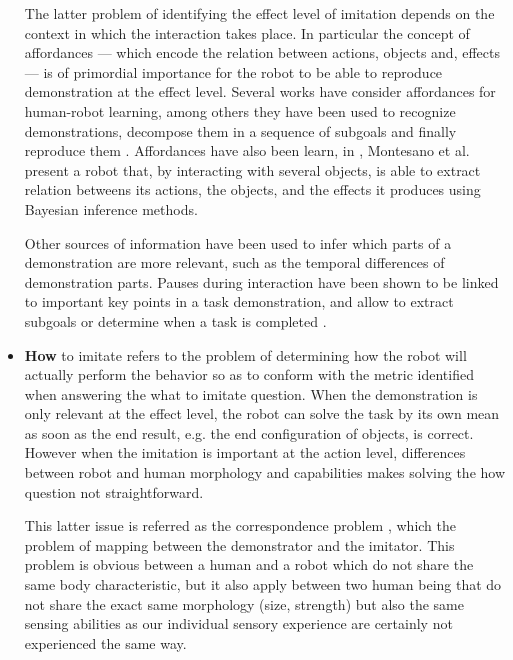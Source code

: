\begin{itemize}
The latter problem of identifying the effect level of imitation depends on the context in which the interaction takes place. In particular the concept of affordances \cite{gibson1986ecological} --- which encode the relation between actions, objects and, effects --- is of primordial importance for the robot to be able to reproduce demonstration at the effect level. Several works have consider affordances for human-robot learning, among others they have been used to recognize demonstrations, decompose them in a sequence of subgoals and finally reproduce them \cite{macl07affimit}. Affordances have also been learn, in \cite{montesano2008learning}, Montesano et al. present a robot that, by interacting with several objects, is able to extract relation betweens its actions, the objects, and the effects it produces using Bayesian inference methods. 

Other sources of information have been used to infer which parts of a demonstration are more relevant, such as the temporal differences of demonstration parts. Pauses during interaction have been shown to be linked to important key points in a task demonstration, and allow to extract subgoals or determine when a task is completed \cite{theofilis2013temporal}.

\item \textbf{How} to imitate refers to the problem of determining how the robot will actually perform the behavior so as to conform with the metric identified when answering the what to imitate question. When the demonstration is only relevant at the effect level, the robot can solve the task by its own mean as soon as the end result, e.g. the end configuration of objects, is correct. However when the imitation is important at the action level, differences between robot and human morphology and capabilities makes solving the how question not straightforward.

This latter issue is referred as the correspondence problem \cite{nehaniv2002correspondence}, which the problem of mapping between the demonstrator and the imitator. This problem is obvious between a human and a robot which do not share the same body characteristic, but it also apply between two human being that do not share the exact same morphology (size, strength) but also the same sensing abilities as our individual sensory experience are certainly not experienced the same way.



\end{itemize}
